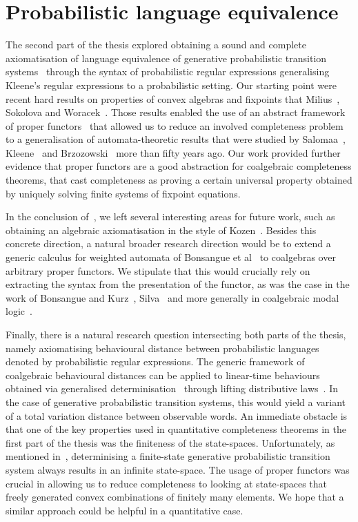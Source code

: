 \section{Probabilistic language equivalence}
The second part of the thesis explored obtaining a sound and complete axiomatisation of language equivalence of generative probabilistic transition systems~\cite{Glabbeek:1995:Reactive} through the syntax of probabilistic regular expressions generalising Kleene's regular expressions to a probabilistic setting. Our starting point were recent hard results on properties of convex algebras and fixpoints that Milius~\cite{Milius:2018:Proper}, Sokolova and Woracek~\cite{Sokolova:2015:Congruences,Sokolova:2018:Proper}. Those results enabled the use of an abstract framework of proper functors~\cite{Milius:2018:Proper} that allowed us to reduce an involved completeness problem to a generalisation of automata-theoretic results that were studied by Salomaa~\cite{Salomaa:1966:Two}, Kleene~\cite{Kleene:1951:Representation} and Brzozowski~\cite{Brzozowski:1964:Expressions} more than fifty years ago. Our work provided further evidence that proper functors are a good abstraction for coalgebraic completeness theorems, that cast completeness as proving a certain universal property obtained by uniquely solving finite systems of fixpoint equations. 

In the conclusion of~, we left several interesting areas for future work, such as obtaining an algebraic axiomatisation in the style of Kozen~\cite{Kozen:1994:Completeness}. Besides this concrete direction, a natural broader research direction would be to extend a generic calculus for weighted automata of Bonsangue et al~\cite{Bonsangue:2013:Sound} to coalgebras over arbitrary proper functors. We stipulate that this would crucially rely on extracting the syntax from the presentation of the functor, as was the case in the work of Bonsangue and Kurz~\cite{Bonsangue:2006:Presenting}, Silva~\cite{Silva:2010:Kleene} and more generally in coalgebraic modal logic~\cite{Schroder:2008:Expressivity}.

Finally, there is a natural research question intersecting both parts of the thesis, namely axiomatising behavioural distance between probabilistic languages denoted by probabilistic regular expressions. The generic framework of coalgebraic behavioural distances can be applied to linear-time behaviours obtained via generalised determinisation~\cite{Silva:2010:Generalizing} through lifting distributive laws~\cite{Baldan:2018:Coalgebraic}. In the case of generative probabilistic transition systems, this would yield a variant of a total variation distance between observable words. An immediate obstacle is that one of the key properties used in quantitative completeness theorems in the first part of the thesis was the finiteness of the state-spaces. Unfortunately, as mentioned in~, determinising a finite-state generative probabilistic transition system always results in an infinite state-space. The usage of proper functors was crucial in allowing us to reduce completeness to looking at state-spaces that freely generated convex combinations of finitely many elements. We hope that a similar approach could be helpful in a quantitative case.